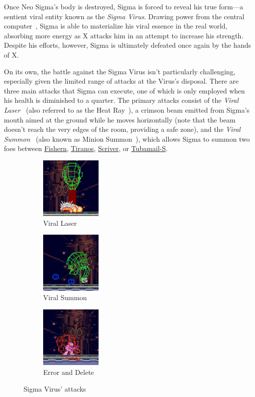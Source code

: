 Once Neo Sigma's body is destroyed, Sigma is forced to reveal his true form—a sentient viral entity known as the \emph{Sigma Virus}. Drawing power from the central computer~\cite{wayback:X2_resources}, Sigma is able to materialize his viral essence in the real world, absorbing more energy as X attacks him in an attempt to increase his strength. Despite his efforts, however, Sigma is ultimately defeated once again by the hands of X.


On its own, the battle against the Sigma Virus isn't particularly challenging, especially given the limited range of attacks at the Virus's disposal. There are three main attacks that Sigma can execute, one of which is only employed when his health is diminished to a quarter. The primary attacks consist of the \emph{Viral Laser}~\cite{book:MH_field_guide} (also referred to as the Heat Ray~\cite{book:Compendium}), a crimson beam emitted from Sigma's mouth aimed at the ground while he moves horizontally (note that the beam doesn't reach the very edges of the room, providing a safe zone), and the \emph{Viral Summon}~\cite{book:MH_field_guide} (also known as Minion Summon~\cite{book:Compendium}), which allows Sigma to summon two foes between \hyperlink{enem:Fishern}{Fishern}, \hyperlink{enem:Tiranos}{Tiranos}, \hyperlink{enem:Scriver}{Scriver}, or \hyperlink{enem:Tubamail-S}{Tubamail-S}.
\begin{figure}[htp]
	\centering
	\begin{subfigure}{0.25\linewidth}
		\centering
		\includegraphics[height=3cm]{figures/X2/Hunter_stages/Sigma_virus_laser.png}
		\caption{Viral Laser}	
	\end{subfigure}
	\begin{subfigure}{0.25\linewidth}
		\centering
		\includegraphics[height=3cm]{figures/X2/Hunter_stages/Sigma_virus_spawn.png}
		\caption{Viral Summon}
	\end{subfigure}
	\begin{subfigure}{0.25\linewidth}
		\centering
		\includegraphics[height=3cm]{figures/X2/Hunter_stages/Sigma_virus_trap.png}
		\caption{Error and Delete}
	\end{subfigure}
	\caption{Sigma Virus' attacks}
\end{figure}
